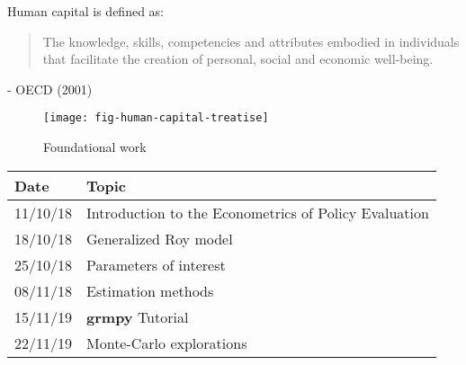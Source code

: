 \begin{frame}
Human capital is defined as:
\vspace{\baselineskip}

\begin{quote}
The knowledge, skills, competencies and attributes embodied in individuals that facilitate
the creation of personal, social and economic well-being.
\end{quote}\vspace{-0.5pt} \hspace{6cm} - OECD (2001)
\end{frame}

\begin{frame}
	\begin{figure}
		\caption{Foundational work}
		\centering\texttt{[image: fig-human-capital-treatise]}
	\end{figure}
\end{frame}
\begin{frame}
\centering
\begin{threeparttable}\footnotesize
  \caption{Lecture plan}
  \begin{tabular}{ll}\toprule
  Date & Topic \\\midrule
   11/10/18  & Introduction to the Econometrics of Policy Evaluation  \\
   18/10/18  & Generalized Roy model                                  \\
   25/10/18  & Parameters of interest                                 \\
   08/11/18  & Estimation methods                                     \\
   15/11/19  & \textbf{grmpy} Tutorial                                       \\
   22/11/19  & Monte-Carlo explorations                               \\
\bottomrule
\end{tabular}
\end{threeparttable}
\end{frame}

